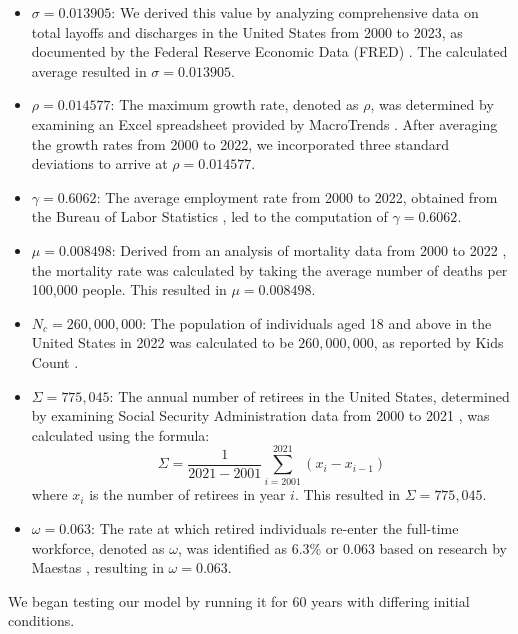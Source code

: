 \documentclass{article}
\begin{document}
\begin{itemize}
    \item $\sigma = 0.013905$: We derived this value by analyzing comprehensive data on total layoffs and discharges in the United States from 2000 to 2023, as documented by the Federal Reserve Economic Data (FRED) \cite{FRED}. The calculated average resulted in $\sigma = 0.013905$.
    \item $\rho = 0.014577$: The maximum growth rate, denoted as $\rho$, was determined by examining an Excel spreadsheet provided by MacroTrends \cite{MacroTrends}. After averaging the growth rates from 2000 to 2022, we incorporated three standard deviations to arrive at $\rho = 0.014577$.
    \item $\gamma = 0.6062$: The average employment rate from 2000 to 2022, obtained from the Bureau of Labor Statistics \cite{BLS}, led to the computation of $\gamma = 0.6062$.
    \item $\mu = 0.008498$: Derived from an analysis of mortality data from 2000 to 2022 \cite{usafacts}, the mortality rate was calculated by taking the average number of deaths per 100,000 people. This resulted in $\mu = 0.008498$.
    \item $N_c = 260,000,000$: The population of individuals aged 18 and above in the United States in 2022 was calculated to be $260,000,000$, as reported by Kids Count \cite{kidscount}.
    \item $\Sigma = 775,045$: The annual number of retirees in the United States, determined by examining Social Security Administration data from 2000 to 2021 \cite{ssa}, was calculated using the formula:
    \[
        \Sigma = \frac{1}{2021 - 2001}\sum_{i=2001}^{2021}(x_i - x_{i-1})
    \]
    where $x_i$ is the number of retirees in year $i$. This resulted in $\Sigma = 775,045$.
    \item $\omega = 0.063$: The rate at which retired individuals re-enter the full-time workforce, denoted as $\omega$, was identified as 6.3\% or $0.063$ based on research by Maestas \cite{maestas}, resulting in $\omega = 0.063$.
\end{itemize}

We began testing our model by running it for 60 years with differing initial conditions.
\end{document}
